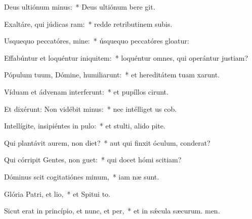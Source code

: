 \item Deus ultiónum minus:~* Deus ultiónum bere git.
\item Exaltáre, qui júdicas ram:~* redde retributinem subis.
\item Usquequo peccatóres, mine:~* úsquequo peccatóres gloatur:
\item Effabúntur et loquéntur iniquitem:~* loquéntur omnes, qui operántur justiam?
\item Pópulum tuum, Dómine, humiliarunt:~* et hereditátem tuam xarunt.
\item Víduam et ádvenam interferunt:~* et pupíllos cirunt.
\item Et dixérunt: Non vidébit minus:~* nec intélliget us cob.
\item Intellígite, insipiéntes in pulo:~* et stulti, alido pite.
\item Qui plantávit aurem, non diet?~* aut qui finxit óculum,  conderat?
\item Qui córripit Gentes, non guet:~* qui docet hómi scitiam?
\item Dóminus scit cogitatiónes minum,~* iam næ sunt.
\item Glória Patri, et lio,~* et Spitui to.
\item Sicut erat in princípio, et nunc, et per,~* et in sǽcula sæcurum. men.
